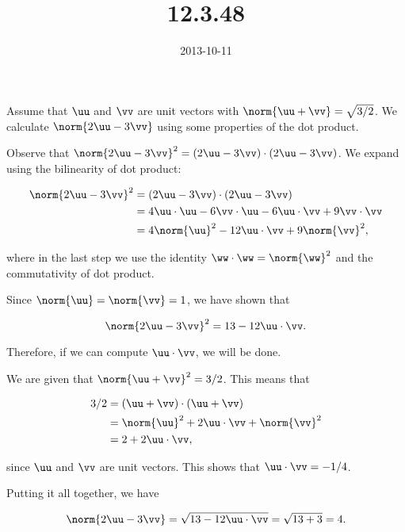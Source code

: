 \documentclass[12pt]{article}
\title{12.3.48}
\date{2013-10-11}
\begin{document}
\thispagestyle{empty}
\maketitle

Assume that $\uu$ and $\vv$ are unit vectors with
$\norm{\uu + \vv} = \sqrt{3/2}$. We calculate $\norm{2\uu - 3\vv}$ using
some properties of the dot product.

Observe that $\norm{2\uu - 3\vv}^2 = (2\uu - 3\vv) \cdot (2\uu - 3\vv)$.
We expand using the bilinearity of dot product:

\begin{align*}
    \norm{2\uu - 3\vv}^2 &= (2\uu - 3\vv) \cdot (2\uu - 3\vv) \\
         &= 4 \uu \cdot \uu - 6 \vv \cdot \uu - 6 \uu \cdot \vv + 9 \vv \cdot \vv \\
         &= 4 \norm{\uu}^2 - 12 \uu \cdot \vv + 9 \norm{\vv}^2,
\end{align*}

where in the last step we use the identity
$\ww \cdot \ww = \norm{\ww}^2$ and the commutativity of dot product.

Since $\norm{\uu} = \norm{\vv} = 1$, we have shown that

\begin{equation*}
    \norm{2\uu - 3\vv}^2 = 13 - 12 \uu \cdot \vv.
\end{equation*}

Therefore, if we can compute $\uu \cdot \vv$, we will be done.

We are given that $\norm{\uu + \vv}^2 = 3/2$. This means that

\begin{align*}
3/2 &= (\uu + \vv) \cdot (\uu + \vv) \\
    &= \norm{\uu}^2 + 2 \uu \cdot \vv + \norm{\vv}^2 \\
    &= 2 + 2 \uu \cdot \vv, 
\end{align*}

since $\uu$ and $\vv$ are unit vectors. This shows that
$\uu \cdot \vv = -1/4$.

Putting it all together, we have

\begin{equation*}
    \norm{2\uu - 3\vv} = \sqrt{13 - 12 \uu \cdot \vv} = \sqrt{13 + 3} = 4.
\end{equation*}
\end{document}
